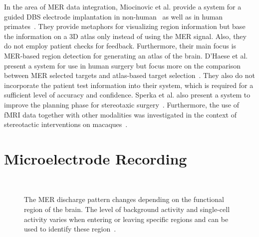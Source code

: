 \documentclass{vgtc}                          %
\begin{document}
In the area of MER data integration, Miocinovic et al. provide a system for a guided DBS electrode implantation in non-human~\cite{Miocinovic2007} as well as in human primates~\cite{Cicerone2}. They provide metaphors for visualizing region information but base the information on a 3D atlas only instead of using the MER signal. Also, they do not employ patient checks for feedback. Furthermore, their main focus is MER-based region detection for generating an atlas of the brain. D'Haese et al. present a system for use in human surgery but focus more on the comparison between MER selected targets and atlas-based target selection~\cite{Haese2005}. They also do not incorporate the patient test information into their system, which is required for a sufficient level of accuracy and confidence. Sperka et al. also present a system to improve the planning phase for stereotaxic surgery~\cite{Sperka2011}. Furthermore, the use of fMRI data together with other modalities was investigated in the context of stereotactic interventions on macaques~\cite{Ohayon2012}.
%
%
%

\section{Microelectrode Recording}\label{sec:mer}
\begin{figure}
    \centering
    \\
    \caption{The MER discharge pattern changes depending on the functional region of the brain. The level of background activity and single-cell activity varies when entering or leaving specific regions and can be used to identify these region~\cite{Benazzouz2002,Hutchison1998}.}
    \label{fig:dischargepatterns}
\end{figure}
\end{document}
